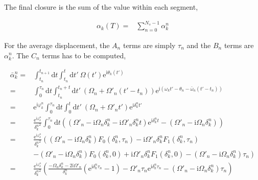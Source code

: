 \documentclass[10pt,fleqn]{article}
\newcommand{\ud}{\mathrm{d}}
\newcommand{\ue}{\mathrm{e}}
\newcommand{\ui}{\mathrm{i}}
\newcommand{\eqar}[1]
{
  \begin{align*}
    #1
  \end{align*}
}
\newcommand{\paren}[1]{{\left({#1}\right)}}
\newcommand{\lparen}[1]{{\left({#1}\right.}}
\newcommand{\rparen}[1]{{\left.{#1}\right)}}
\begin{document}
The final closure is the sum of the value within each segment,
\eqar{
  \alpha_k(T)=&\sum_{n=0}^{N_s-1}\alpha_k^n
}

For the average displacement, the $A_n$ terms are simply $\tau_n$ and the $B_n$ terms
are $\alpha_k^n$. The $C_n$ terms has to be computed,
\eqar{
  \bar\alpha_k^n=&\int_{t_{n}}^{t_{n+1}}\!\!\ud t\int_{t_n}^{t}\!\!\ud t'\ \Omega(t')\ue^{\ui\theta_k(t')}\\
  =&\int_{0}^{\tau_n}\!\!\ud t\int_{t_n}^{t_n+t}\!\!\ud t'\ \paren{\Omega_n+\Omega'_n\paren{t'-t_n}}\ue^{\ui\paren{\omega_kt'-\theta_n-\bar\omega_n\paren{t'-t_n}}}\\
  =&\ue^{\ui\varphi_k^n}\int_{0}^{\tau_n}\!\!\ud t\int_{0}^{t}\!\!\ud t'\ \paren{\Omega_n+\Omega'_n t'}\ue^{\ui\delta_k^nt'}\\
  =&\frac{\ue^{\ui\varphi_k^n}}{{\delta_k^n}^2}\int_{0}^{\tau_n}\!\!\ud t
  \paren{\paren{\Omega'_n-\ui\Omega_n\delta_k^n-\ui\Omega'_n\delta_k^nt}\ue^{\ui\delta_k^nt}-\paren{\Omega'_n-\ui\Omega_n\delta_k^n}}\\
  =&\frac{\ue^{\ui\varphi_k^n}}{{\delta_k^n}^2}
  \lparen{\paren{\Omega'_n-\ui\Omega_n\delta_k^n}F_0(\delta_k^n, \tau_n)-\ui\Omega'_n\delta_k^nF_1(\delta_k^n, \tau_n)}\\
  &\rparen{-\paren{\Omega'_n-\ui\Omega_n\delta_k^n}F_0(\delta_k^n, 0)+\ui\Omega'_n\delta_k^nF_1(\delta_k^n, 0)-\paren{\Omega'_n-\ui\Omega_n\delta_k^n}\tau_n}\\
  =&\frac{\ue^{\ui\varphi_k^n}}{{\delta_k^n}^2}
  \paren{\frac{-\Omega_n\delta_k^n-2\ui\Omega'_n}{{\delta_k^n}}\paren{\ue^{\ui{\delta_k^n}\tau_n} - 1}-\Omega'_n\tau_n\ue^{\ui{\delta_k^n}\tau_n}-\paren{\Omega'_n-\ui\Omega_n\delta_k^n}\tau_n}\\
}
\end{document}
